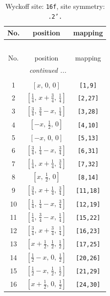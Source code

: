\documentclass[fleqn,8pt]{jsarticle}
\begin{document}
\begin{longtable}{ccc}
\caption{Wyckoff site: {\tt 16f}, site symmetry: {\tt .2'.}}
 \\
 \hline \hline
No. & position & mapping \\ \hline \endfirsthead

\multicolumn{2}{l}{\tablename\ \thetable{}} \\
 \hline \hline
No. & position & mapping \\ \hline \endhead

 \hline \hline
\multicolumn{2}{r}{\footnotesize\it continued ...} \\ \endfoot

 \hline \hline
\multicolumn{2}{r}{} \\ \endlastfoot

1 & $\left[ x,\, 0,\, 0 \right]$ & {\tt [1,9]} \\ \hline
2 & $\left[ \frac{1}{4},\, x + \frac{3}{4},\, \frac{1}{4} \right]$ & {\tt [2,27]} \\ \hline
3 & $\left[ \frac{3}{4},\, \frac{3}{4} - x,\, \frac{1}{4} \right]$ & {\tt [3,28]} \\ \hline
4 & $\left[ - x,\, \frac{1}{2},\, 0 \right]$ & {\tt [4,10]} \\ \hline
5 & $\left[ - x,\, 0,\, 0 \right]$ & {\tt [5,13]} \\ \hline
6 & $\left[ \frac{3}{4},\, \frac{1}{4} - x,\, \frac{3}{4} \right]$ & {\tt [6,31]} \\ \hline
7 & $\left[ \frac{1}{4},\, x + \frac{1}{4},\, \frac{3}{4} \right]$ & {\tt [7,32]} \\ \hline
8 & $\left[ x,\, \frac{1}{2},\, 0 \right]$ & {\tt [8,14]} \\ \hline
9 & $\left[ \frac{3}{4},\, x + \frac{1}{4},\, \frac{3}{4} \right]$ & {\tt [11,18]} \\ \hline
10 & $\left[ \frac{1}{4},\, \frac{1}{4} - x,\, \frac{3}{4} \right]$ & {\tt [12,19]} \\ \hline
11 & $\left[ \frac{1}{4},\, \frac{3}{4} - x,\, \frac{1}{4} \right]$ & {\tt [15,22]} \\ \hline
12 & $\left[ \frac{3}{4},\, x + \frac{3}{4},\, \frac{1}{4} \right]$ & {\tt [16,23]} \\ \hline
13 & $\left[ x + \frac{1}{2},\, \frac{1}{2},\, \frac{1}{2} \right]$ & {\tt [17,25]} \\ \hline
14 & $\left[ \frac{1}{2} - x,\, 0,\, \frac{1}{2} \right]$ & {\tt [20,26]} \\ \hline
15 & $\left[ \frac{1}{2} - x,\, \frac{1}{2},\, \frac{1}{2} \right]$ & {\tt [21,29]} \\ \hline
16 & $\left[ x + \frac{1}{2},\, 0,\, \frac{1}{2} \right]$ & {\tt [24,30]} \\
\end{longtable}
\end{document}

